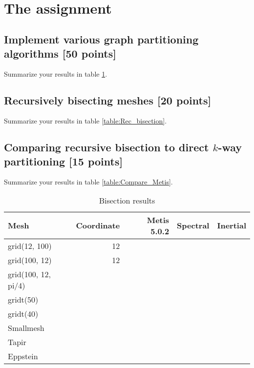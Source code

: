 \documentclass[unicode,11pt,a4paper,oneside,numbers=endperiod,openany]{scrartcl}
\begin{document}
\setassignment
{}

\newline

\assignmentpolicy
\clearpage
\section{The assignment}

\subsection{Implement various graph partitioning algorithms [50 points]}
Summarize your results in table \ref{table:bisection}.


\subsection{Recursively bisecting meshes [20 points]}

Summarize your results in table \ref{table:Rec_bisection}.

\subsection{Comparing recursive bisection to direct $k$-way partitioning [15 points]}

Summarize your results in table \ref{table:Compare_Metis}.

\begin{table}[h]
\caption{Bisection results}
\centering
\begin{tabular}{l|r|r|r|r} \hline\hline 
Mesh             &  Coordinate           & Metis 5.0.2  & Spectral & Inertial  \\ \hline
grid(12, 100)          &   12                   &             &          &           \\             
grid(100, 12)          &   12                   &             &          &           \\ 
grid(100, 12, pi/4)   &                        &             &          &           \\ 
gridt(50)            &                        &             &          &           \\
gridt(40)            &                        &             &          &           \\
Smallmesh            &                        &             &          &           \\ 
Tapir            &                        &             &          &           \\ 
Eppstein            &                        &             &          &           \\ 
\hline \hline
\end{tabular}
\label{table:bisection}
\end{table}
\end{document}
